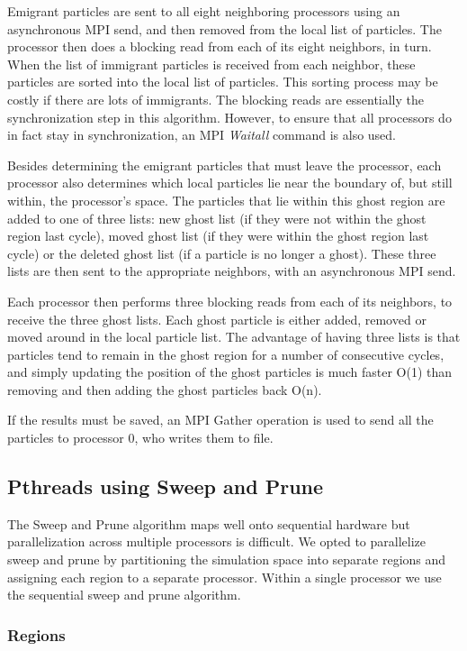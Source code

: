 \documentclass[11pt]{article} %
\begin{document}
Emigrant particles are sent to all eight neighboring processors using an asynchronous MPI send, and then removed from the local list of particles. The processor then does a blocking read from each of its eight neighbors, in turn. When the list of immigrant particles is received from each neighbor, these particles are sorted into the local list of particles. This sorting process may be costly if there are lots of immigrants. The blocking reads are essentially the synchronization step in this algorithm. However, to ensure that all processors do in fact stay in synchronization, an MPI {\em Waitall} command is also used.

Besides determining the emigrant particles that must leave the processor, each processor also determines which local particles lie near the boundary of, but still within, the processor's space. The particles that lie within this ghost region are added to one of three lists: new ghost list (if they were not within the ghost region last cycle), moved ghost list (if they were within the ghost region last cycle) or the deleted ghost list (if a particle is no longer a ghost). These three lists are then sent to the appropriate neighbors, with an asynchronous MPI send.

Each processor then performs three blocking reads from each of its neighbors, to receive the three ghost lists. Each ghost particle is either added, removed or moved around in the local particle list. The advantage of having three lists is that particles tend to remain in the ghost region for a number of consecutive cycles, and simply updating the position of the ghost particles is much faster O(1) than removing and then adding the ghost particles back O(n).

If the results must be saved, an MPI Gather operation is used to send all the particles to processor 0, who writes them to file.

\subsection{Pthreads using Sweep and Prune}
The Sweep and Prune algorithm maps well onto sequential hardware but
parallelization across multiple processors is difficult. We opted to
parallelize sweep and prune by partitioning the simulation space into
separate regions and assigning each region to a separate processor.
Within a single processor we use the sequential sweep and prune algorithm. 


\subsubsection{Regions}
\end{document}
